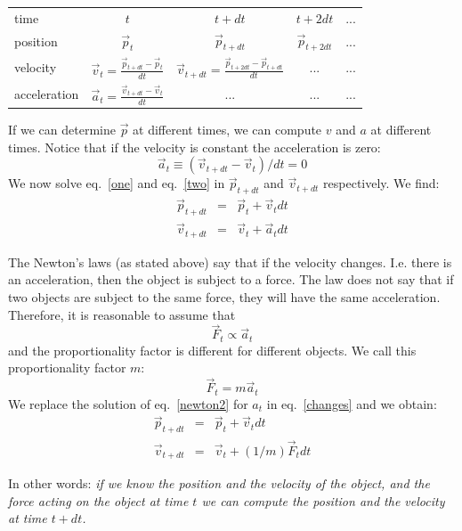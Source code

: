 \documentclass[12pt]{article}
\begin{document}
\begin{center}
\begin{tabular}{lcccc} \hline
time & $t$ & $t+dt$ & $t+2dt$ & ... \\
position & $\vec p_t$ & $\vec p_{t+dt}$ & $\vec p_{t+2dt}$ & ... \\
velocity & $\vec v_t = \frac{\vec p_{t+dt}-\vec p_t}{dt}$ & $\vec v_{t+dt} = \frac{\vec p_{t+2dt}-\vec p_{t+dt}}{dt}$ & ... & ... \\
acceleration & $\vec a_t = \frac{\vec v_{t+dt}-\vec v_t}{dt}$ & ... & ... & ... \\ \hline
\end{tabular}
\end{center}

If we can determine $\vec p$ at different times, we can compute $v$ and $a$ at different times. Notice that if the velocity is constant the acceleration is zero:
\begin{equation}
\vec a_t \equiv (\vec v_{t+dt}-\vec v_t)/dt = 0
\end{equation}
We now solve eq.~\ref{one} and eq.~\ref{two} in $\vec p_{t+dt}$ and $\vec v_{t+dt}$ respectively. We find:
\begin{eqnarray}
\vec p_{t+dt} &=& \vec p_t + \vec v_t dt \\ 
\vec v_{t+dt} &=& \vec v_t + \vec a_t dt 
\label{changes}
\end{eqnarray}

The Newton's laws (as stated above) say that if the velocity changes. I.e. there is an acceleration, then the object is subject to a force. The law does not say that if two objects are subject to the same force, they will have the same acceleration. Therefore, it is reasonable to assume that
\begin{equation}
\vec F_t \propto \vec a_t
\end{equation}
and the proportionality factor is different for different objects. We call this proportionality factor $m$:
\begin{equation}
\vec F_t = m \vec a_t
\label{newton2}
\end{equation}
We replace the solution of eq.~\ref{newton2} for $a_t$ in eq.~\ref{changes} and we obtain:
\begin{eqnarray}
\vec p_{t+dt} &=& \vec p_t + \vec v_t dt \label{p_update} \\
\vec v_{t+dt} &=& \vec v_t + (1/m) \vec F_t dt \label{v_update}
\end{eqnarray}

In other words: {\it if we know the position and the velocity of the object, and the force acting on the object at time $t$ we can compute the position and the velocity at time $t+dt$.}
\end{document}
